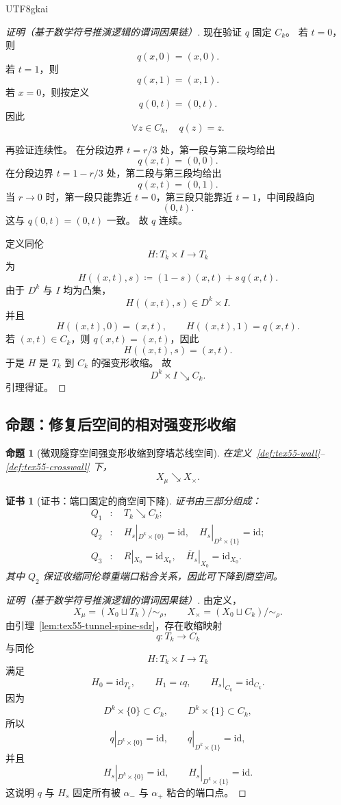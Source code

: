 \documentclass[12pt]{article}
\newtheorem{proposition}{命题}[section]
\newtheorem{Certificate}{证书}[section]
\newcommand{\DefEq}{\coloneqq}
\newcommand{\id}{\mathrm{id}}
\newcommand{\incl}{\iota}
\begin{document}
\begin{CJK*}{UTF8}{gkai}
\begin{proof}[证明（基于数学符号推演逻辑的谓词因果链）]
现在验证 \(q\) 固定 \(C_k\)。
若 \(t=0\)，则
\[
  q(x,0)=(x,0).
\]
若 \(t=1\)，则
\[
  q(x,1)=(x,1).
\]
若 \(x=0\)，则按定义
\[
  q(0,t)=(0,t).
\]
因此
\[
  \forall z\in C_k,\quad q(z)=z.
\]

再验证连续性。
在分段边界 \(t=r/3\) 处，第一段与第二段均给出
\[
  q(x,t)=(0,0).
\]
在分段边界 \(t=1-r/3\) 处，第二段与第三段均给出
\[
  q(x,t)=(0,1).
\]
当 \(r\to0\) 时，第一段只能靠近 \(t=0\)，第三段只能靠近 \(t=1\)，中间段趋向
\[
  (0,t).
\]
这与 \(q(0,t)=(0,t)\) 一致。
故 \(q\) 连续。

定义同伦
\[
  H:T_k\times I\to T_k
\]
为
\[
  H((x,t),s)
  \DefEq
  (1-s)(x,t)+s\,q(x,t).
\]
由于 \(D^k\) 与 \(I\) 均为凸集，
\[
  H((x,t),s)\in D^k\times I.
\]
并且
\[
  H((x,t),0)=(x,t),
  \qquad
  H((x,t),1)=q(x,t).
\]
若 \((x,t)\in C_k\)，则 \(q(x,t)=(x,t)\)，因此
\[
  H((x,t),s)=(x,t).
\]
于是 \(H\) 是 \(T_k\) 到 \(C_k\) 的强变形收缩。
故
\[
  D^k\times I\searrow C_k.
\]
引理得证。
\end{proof}

\subsection{命题：修复后空间的相对强变形收缩}
\label{subsec:tex55-repaired-space-sdr}

\begin{proposition}[微观隧穿空间强变形收缩到穿墙芯线空间]
\label{prop:tex55-micro-sdr-cross}
在定义~\ref{def:tex55-wall}--\ref{def:tex55-crosswall} 下，
\[
  X_{\mu}\searrow X_{\times}.
\]
\end{proposition}

\begin{Certificate}[证书：端口固定的商空间下降]
\label{cert:tex55-quotient-descent}
证书由三部分组成：
\[
\begin{aligned}
  Q_1&:\quad T_k\searrow C_k;\\
  Q_2&:\quad H_s|_{D^k\times\{0\}}=\id,\quad
  H_s|_{D^k\times\{1\}}=\id;\\
  Q_3&:\quad R|_{X_0}=\id_{X_0},\quad
  \overline H_s|_{X_0}=\id_{X_0}.
\end{aligned}
\]
其中 \(Q_2\) 保证收缩同伦尊重端口粘合关系，因此可下降到商空间。
\end{Certificate}

\begin{proof}[证明（基于数学符号推演逻辑的谓词因果链）]
由定义，
\[
  X_{\mu}=(X_0\sqcup T_k)/{\sim_{\rho}},
  \qquad
  X_{\times}=(X_0\sqcup C_k)/{\sim_{\rho}}.
\]
由引理~\ref{lem:tex55-tunnel-spine-sdr}，存在收缩映射
\[
  q:T_k\to C_k
\]
与同伦
\[
  H:T_k\times I\to T_k
\]
满足
\[
  H_0=\id_{T_k},
  \qquad
  H_1=\incl q,
  \qquad
  H_s|_{C_k}=\id_{C_k}.
\]
因为
\[
  D^k\times\{0\}\subset C_k,
  \qquad
  D^k\times\{1\}\subset C_k,
\]
所以
\[
  q|_{D^k\times\{0\}}=\id,
  \qquad
  q|_{D^k\times\{1\}}=\id,
\]
并且
\[
  H_s|_{D^k\times\{0\}}=\id,
  \qquad
  H_s|_{D^k\times\{1\}}=\id.
\]
这说明 \(q\) 与 \(H_s\) 固定所有被 \(\alpha_-\) 与 \(\alpha_+\) 粘合的端口点。


\end{proof}
\end{CJK*}
\end{document}
